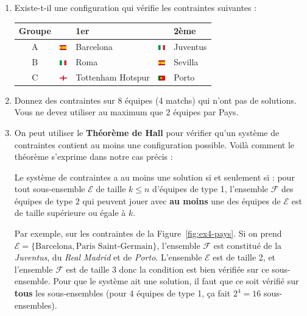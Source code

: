 \documentclass{../ficheTDTP}
\begin{document}
\begin{enumerate}
\begin{enumerate}
\begin{figure}[ht]
\end{figure}

\item Existe-t-il une configuration qui vérifie les contraintes suivantes :

\begin{tabular}{|c|ll|ll|}
\hline
Groupe & & 1er & & 2ème \\ \hline
A & \includegraphics[height=0.2cm]{flags/es.png} & Barcelona & \includegraphics[height=0.2cm]{flags/it.png} & Juventus \\ \hline
B & \includegraphics[height=0.2cm]{flags/it.png} & Roma & \includegraphics[height=0.2cm]{flags/es.png} & Sevilla \\ \hline
C & \includegraphics[height=0.2cm]{flags/en.png} & Tottenham Hotspur & \includegraphics[height=0.2cm]{flags/po.png} & Porto \\ \hline
\end{tabular}

\item Donnez des contraintes sur 8 équipes (4 matchs) qui n'ont pas de solutions. Vous ne devez utiliser au maximum que 2 équipes par Pays.

\item On peut utiliser le \textbf{Théorème de Hall} pour vérifier qu'un système de contraintes contient au moins une configuration possible. Voilà comment le théorème s'exprime dans notre cas précis :

Le système de contraintes a au moins une solution si et seulement si : pour tout sous-ensemble $\mathcal{E}$ de taille $k \leq n$ d'équipes de type 1, l'ensemble $\mathcal{F}$ des équipes de type $2$ qui peuvent jouer avec \textbf{au moins} une des équipes de $\mathcal{E}$ est de taille supérieure ou égale à $k$. 

Par exemple, sur les contraintes de la Figure~\ref{fig:ex4-pays}. Si on prend $\mathcal{E} = \lbrace \text{Barcelona}, \text{Paris Saint-Germain} \rbrace$, l'ensemble $\mathcal{F}$ est constitué de la \textit{Juventus}, du \textit{Real Madrid} et de \textit{Porto}. L'ensemble $\mathcal{E}$ est de taille 2, et l'ensemble $\mathcal{F}$ est de taille 3 donc la condition est bien vérifiée sur ce sous-ensemble. Pour que le système ait une solution, il faut que ce soit vérifié sur \textbf{tous} les sous-ensembles (pour 4 équipes de type 1, ça fait $2^4 = 16$ sous-ensembles).


\end{enumerate}
\end{enumerate}
\end{document}
